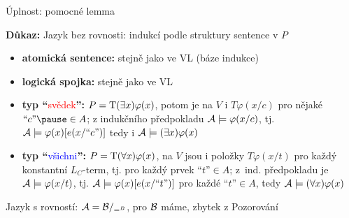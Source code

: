 \documentclass{beamer}
\begin{document}
\begin{frame}{Úplnost: pomocné lemma}

    \pause

    \pause
    \textbf{Důkaz:} \pause
    \alert{Jazyk bez rovnosti:} indukcí podle struktury sentence v $P$\pause

    \begin{itemize}
        \item \textbf{atomická sentence:} stejně jako ve VL (\alert{báze indukce})\pause
        
        \medskip

        \item \textbf{logická spojka:} stejně jako ve VL\pause
        
        \medskip

        \item \textbf{typ ``}\textcolor{red}{svědek}\textbf{'':} \pause \alert{$P=\mathrm{T}(\exists x)\varphi(x)$}, potom je na $V$ i $T\varphi(x/c)$ pro nějaké $\text{``$c$''}\pause\in A$; z indukčního předpokladu $\mathcal{A}\models\varphi(x/c)$, tj. $\mathcal{A}\models\varphi(x)[e(x/\text{``$c$''})]$ tedy i $\mathcal{A}\models(\exists x)\varphi(x)$\pause

        \medskip

        \item \textbf{typ ``}\textcolor{blue}{všichni}\textbf{'':} \pause \alert{$P=\mathrm{T}(\forall x)\varphi(x)$}, na $V$ jsou i položky $T\varphi(x/t)$ pro každý konstantní $L_C$-term, tj. pro každý prvek $\text{``$t$''}\in A$; \pause z~ind. předpokladu je $\mathcal{A}\models\varphi(x/t)$, tj. $\mathcal{A}\models\varphi(x)[e(x/\text{``$t$''})]$ pro každé $\text{``$t$''}\in A$, tedy $\mathcal{A}\models(\forall x)\varphi(x)$
        
    \end{itemize}

    \pause
    \alert{Jazyk s rovností:} $\mathcal{A}=\mathcal{B}/_{=^B}$, pro $\mathcal{B}$ máme, zbytek z Pozorování \hfill\qedsymbol

\end{frame}
\end{document}

